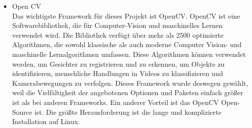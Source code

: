 	\begin{itemize}
		\item Open CV \\
		Das wichtigste Framework für dieses Projekt ist OpenCV. OpenCV ist eine Softwarebibliothek, die für Computer-Vision und maschinelles Lernen verwendet wird. Die Bibliothek verfügt über mehr als 2500 optimierte Algorithmen, die sowohl klassische als auch moderne Computer Vision- und maschinelle Lernalgorithmen umfassen. Diese Algorithmen können verwendet werden, um Gesichter zu registrieren und zu erkennen, um Objekte zu identifizieren, menschliche Handlungen in Videos zu klassifizieren und Kamerabewegungen zu verfolgen. Dieses Framework wurde deswegen gewählt, weil die Vielfältigkeit der angebotenen Optionen und Paketen einfach größer ist als bei anderen Frameworks. Ein anderer Vorteil ist das OpenCV Open-Source ist. Die größte Herausforderung ist die lange und komplizierte Installation auf Linux.

\end{itemize}

